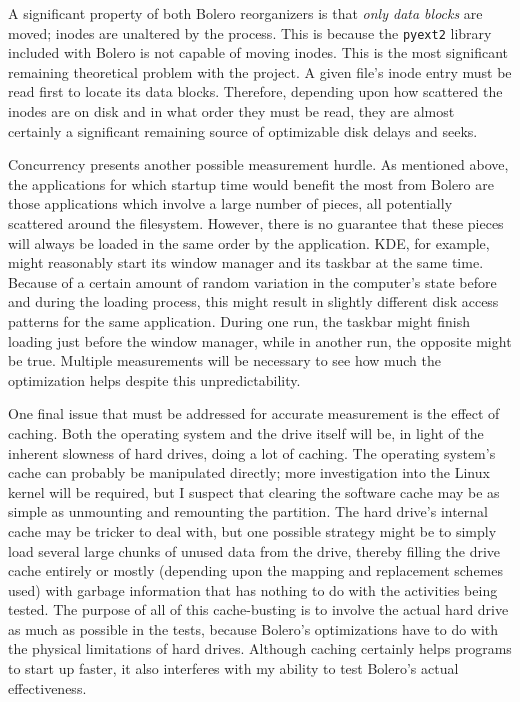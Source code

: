 \documentclass[10pt,twocolumn,letterpaper]{article}
\begin{document}
A significant property of both Bolero reorganizers is that \emph{only data blocks} are moved; inodes are
unaltered by the process. This is because the \texttt{pyext2} library included with Bolero is not capable of moving inodes. This is the most significant remaining theoretical problem with the project. A given file's inode entry must be read first to locate its data blocks. Therefore, depending upon how scattered the inodes are on disk and in what order they must be read, they are almost certainly a significant remaining source of optimizable disk delays and seeks.

Concurrency presents another possible measurement hurdle. As mentioned above, the applications for
which startup time would benefit the most from Bolero are those applications which involve a
large number of pieces, all potentially scattered around the filesystem. However, there is no guarantee
that these pieces will always be loaded in the same order by the application. KDE, for example, might reasonably start its window manager and its taskbar at the same time. Because of a certain amount of random
variation in the computer's state before and during the loading process, this might result in
slightly different disk access patterns for the same application. During one run, the taskbar might finish loading just before the window manager, while in another run, the opposite might be true. Multiple
measurements will be necessary to see how much the optimization helps despite this unpredictability.

One final issue that must be addressed for accurate measurement is the effect of caching. Both
the operating system and the drive itself will be, in light of the inherent slowness of hard drives,
doing a lot of caching. The operating system's cache can probably be manipulated directly; more
investigation into the Linux kernel will be required, but I suspect that clearing the software
cache may be as simple as unmounting and remounting the partition. The hard drive's internal cache
may be tricker to deal with, but one possible strategy might be to simply load several large chunks of
unused data from the drive, thereby filling the drive cache entirely or mostly (depending upon the mapping
and replacement schemes used) with garbage information that has nothing to do with the activities being tested.
The purpose of all of this cache-busting is to involve the actual hard drive as much as possible
in the tests, because Bolero's optimizations have to do with the physical limitations of hard drives. Although caching certainly helps programs to start up faster, it also interferes with my ability to test Bolero's actual effectiveness.
\end{document}
